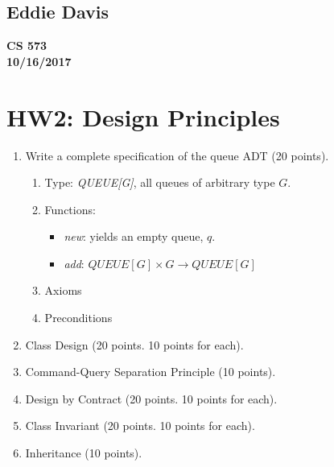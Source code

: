 \documentclass{report}
\begin{document}
\subsection*{Eddie Davis}
\textbf{CS 573}\\
\textbf{10/16/2017}\\

\section*{HW2: Design Principles}

\begin{enumerate}
	\item Write a complete specification of the queue ADT (20 points).
	
	\begin{enumerate}
		\item Type: \textit{QUEUE[G]}, all queues of arbitrary type $G$.
		\item Functions:
		\begin{itemize}
			\item \textit{new}: yields an empty queue, $q$.
			\item \textit{add}: $QUEUE[G] \times G \rightarrow QUEUE[G]$
		\end{itemize}
		
		\item Axioms
		
		\item Preconditions
	\end{enumerate}

	\item Class Design (20 points. 10 points for each).

	\item Command-Query Separation Principle (10 points).
	
	\item Design by Contract  (20 points. 10 points for each).
	
	\item Class Invariant  (20 points. 10 points for each).
	
    \item Inheritance (10 points).

\end{enumerate}
\end{document}
